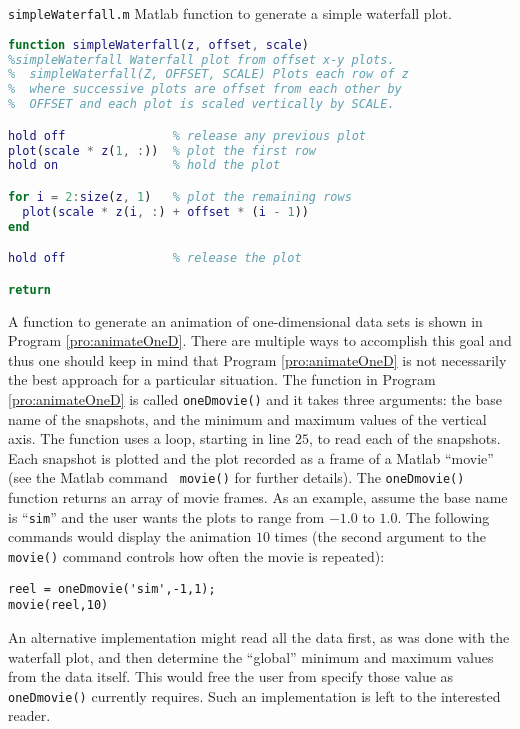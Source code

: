 \begin{program}
{\tt simpleWaterfall.m} Matlab function to generate a simple waterfall
plot. \label{pro:waterfall} 
\codemiddle
\begin{lstlisting}[language=Matlab]
function simpleWaterfall(z, offset, scale)
%simpleWaterfall Waterfall plot from offset x-y plots.
%  simpleWaterfall(Z, OFFSET, SCALE) Plots each row of z
%  where successive plots are offset from each other by
%  OFFSET and each plot is scaled vertically by SCALE.

hold off               % release any previous plot
plot(scale * z(1, :))  % plot the first row
hold on                % hold the plot

for i = 2:size(z, 1)   % plot the remaining rows
  plot(scale * z(i, :) + offset * (i - 1))
end

hold off               % release the plot

return
\end{lstlisting}
\end{program}

A function to generate an animation of one-dimensional data sets is
shown in Program \ref{pro:animateOneD}.  There are multiple ways to
accomplish this goal and thus one should keep in mind that Program
\ref{pro:animateOneD} is not necessarily the best approach for a
particular situation.  The function in Program \ref{pro:animateOneD}
is called {\tt oneDmovie()} and it takes three arguments: the base
name of the snapshots, and the minimum and maximum values of the
vertical axis.  The function uses a loop, starting in line $25$, to
read each of the snapshots.  Each snapshot is plotted and the plot
recorded as a frame of a Matlab ``movie'' (see the Matlab command {\tt
movie()} for further details).  The {\tt oneDmovie()} function returns
an array of movie frames.  As an example, assume the base name is
``{\tt sim}'' and the user wants the plots to range from $-1.0$ to
$1.0$.  The following commands would display the animation $10$ times
(the second argument to the {\tt movie()} command controls how often
the movie is repeated):
\small
\renewcommand{\baselinestretch}{1.0}
\begin{verbatim}
reel = oneDmovie('sim',-1,1);
movie(reel,10)
\end{verbatim}
\normalsize
\renewcommand{\baselinestretch}{1.0}
An alternative implementation might read all the data first, as was
done with the waterfall plot, and then determine the ``global''
minimum and maximum values from the data itself.  This would free the
user from specify those value as {\tt oneDmovie()} currently requires.
Such an implementation is left to the interested reader.


